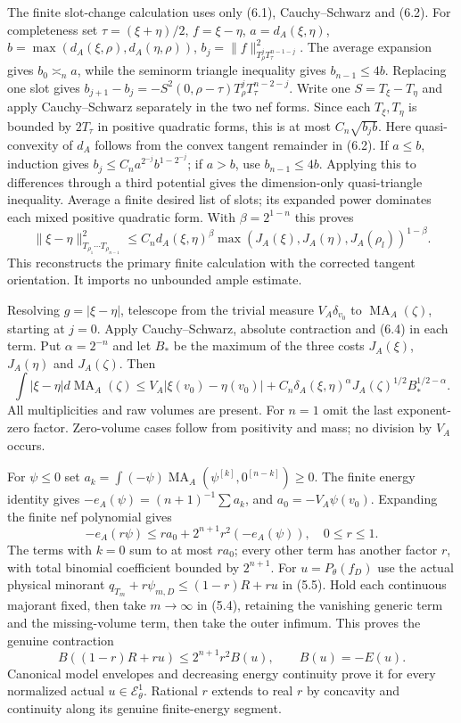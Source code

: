 \documentclass[10pt]{article}
\newcommand{\MA}{\operatorname{MA}}
\newcommand{\EE}{\mathcal E^1_\theta}
\begin{document}
The finite slot-change calculation uses only (6.1), Cauchy--Schwarz and
(6.2). For completeness set $\tau=(\xi+\eta)/2$, $f=\xi-\eta$,
$a=d_A(\xi,\eta)$, $b=\max(d_A(\xi,\rho),d_A(\eta,\rho))$,
$b_j=\|f\|^2_{T_\rho^jT_\tau^{n-1-j}}$.
The average expansion gives $b_0\asymp_n a$, while the seminorm
triangle inequality gives $b_{n-1}\leq4b$. Replacing one slot gives
$b_{j+1}-b_j=-S^2(0,\rho-\tau)T_\rho^jT_\tau^{n-2-j}$.
Write one $S=T_\xi-T_\eta$ and apply Cauchy--Schwarz separately in
the two nef forms. Since each $T_\xi,T_\eta$ is bounded by $2T_\tau$
in positive quadratic forms, this is at most $C_n\sqrt{b_jb}$.
Here quasi-convexity of $d_A$ follows from the convex tangent remainder
in (6.2). If $a\leq b$, induction gives
$b_j\leq C_n a^{2^{-j}}b^{1-2^{-j}}$; if $a>b$, use $b_{n-1}\leq4b$.
Applying this to differences through a third potential gives the
dimension-only quasi-triangle inequality. Average a finite desired list
of slots; its expanded power dominates each mixed positive quadratic
form. With $\beta=2^{1-n}$ this proves
\[
 \|\xi-\eta\|^2_{T_{\rho_1}\cdots T_{\rho_{n-1}}}
 \leq C_n d_A(\xi,\eta)^\beta
       \max(J_A(\xi),J_A(\eta),J_A(\rho_l))^{1-\beta}.
 \tag{6.4}
\]
This reconstructs the primary finite calculation with the corrected
tangent orientation. It imports no unbounded ample estimate.

Resolving $g=|\xi-\eta|$, telescope from the trivial measure
$V_A\delta_{v_0}$ to $\MA_A(\zeta)$, starting at $j=0$.
Apply Cauchy--Schwarz, absolute contraction and (6.4) in each term.
Put $\alpha=2^{-n}$ and let $B_*$ be the maximum of the three costs
$J_A(\xi)$, $J_A(\eta)$ and $J_A(\zeta)$. Then
\[
 \int|\xi-\eta|d\MA_A(\zeta)
 \leq V_A|\xi(v_0)-\eta(v_0)|
   +C_n\delta_A(\xi,\eta)^\alpha J_A(\zeta)^{1/2}B_*^{1/2-\alpha}.
 \tag{6.5}
\]
All multiplicities and raw volumes are present. For $n=1$ omit the
last exponent-zero factor. Zero-volume cases follow from positivity and
mass; no division by $V_A$ occurs.

For $\psi\leq0$ set
$a_k=\int(-\psi)\MA_A(\psi^{[k]},0^{[n-k]})\geq0$.
The finite energy identity gives $-e_A(\psi)=(n+1)^{-1}\sum a_k$,
and $a_0=-V_A\psi(v_0)$. Expanding the finite nef polynomial gives
\[
 -e_A(r\psi)\leq r a_0+2^{n+1}r^2(-e_A(\psi)),\quad0\leq r\leq1.
 \tag{6.6}
\]
The terms with $k=0$ sum to at most $ra_0$; every other term has
another factor $r$, with total binomial coefficient bounded by $2^{n+1}$.
For $u=P_\theta(f_D)$ use the actual physical minorant
$q_{T_m}+r\psi_{m,D}\leq(1-r)R+ru$ in (5.5). Hold each continuous
majorant fixed, then take $m\to\infty$ in (5.4), retaining the vanishing
generic term and the missing-volume term, then take the outer infimum.
This proves the genuine contraction
\[
 B((1-r)R+ru)\leq2^{n+1}r^2B(u),\qquad B(u)=-E(u).
 \tag{6.7}
\]
Canonical model envelopes and decreasing energy continuity prove it for
every normalized actual $u\in\EE$. Rational $r$ extends to real $r$
by concavity and continuity along its genuine finite-energy segment.
\end{document}
